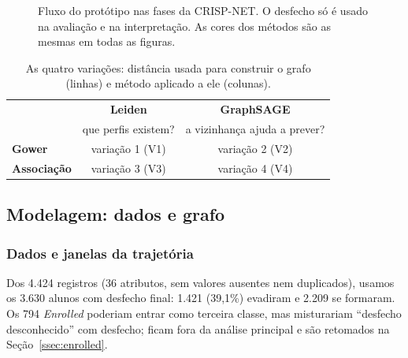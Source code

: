 \begin{figure}[!ht]
\caption{Fluxo do protótipo nas fases da CRISP-NET. O desfecho só é usado na avaliação e na interpretação. As cores dos métodos são as mesmas em todas as figuras.}
\label{fig-fluxo}
\end{figure}

\begin{table}[!ht]
\centering
\caption{As quatro variações: distância usada para construir o grafo (linhas) e método aplicado a ele (colunas).}
\label{tab-variacoes}
\small
\begin{tabular}{@{}lcc@{}}
\toprule
 & \textbf{\textcolor{corLeiden}{Leiden}} & \textbf{\textcolor{corSage}{GraphSAGE}} \\
 & \footnotesize que perfis existem? & \footnotesize a vizinhança ajuda a prever? \\
\midrule
\textbf{Gower}      & variação 1 (V1) & variação 2 (V2) \\
\textbf{Associação} & variação 3 (V3) & variação 4 (V4) \\
\bottomrule
\end{tabular}
\end{table}

\subsection{Modelagem: dados e grafo}

\subsubsection{Dados e janelas da trajetória}

Dos 4.424 registros (36 atributos, sem valores ausentes nem duplicados), usamos os 3.630 alunos com desfecho final: 1.421 (39,1\%) evadiram e 2.209 se formaram. Os 794 \textit{Enrolled} poderiam entrar como terceira classe, mas misturariam ``desfecho desconhecido'' com desfecho; ficam fora da análise principal e são retomados na Seção~\ref{ssec:enrolled}.


